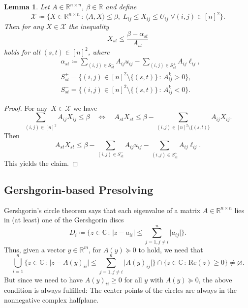 \documentclass[10pt, a4paper]{article}
\renewcommand{\Re}{\text{Re}}
\newcommand{\suchthat}{\,:\,}
\newcommand{\abs}[1]{\lvert{#1}\rvert}
\newcommand{\define}{\coloneqq}
\newcommand{\skal}[2]{\langle{#1},{#2}\rangle}
\newcommand{\R}{\mathds{R}}
\newcommand{\C}{\mathds{C}}
\newtheorem{lemma}[theorem]{Lemma}
\begin{document}
\begin{lemma}
  Let $A \in \R^{n \times n}$, $\beta \in \R$ and define
  \[
    \mathcal{X} \define \{ X \in \R^{n\times n} \suchthat \skal{A}{X} \leq
    \beta,\; L_{ij} \leq X_{ij} \leq U_{ij}\; \forall (i,j) \in [n]^2\}.
  \]
  Then for any $X \in \mathcal{X}$ the inequality
  \[
    X_{st} \leq \frac{\beta - \alpha_{st}}{A_{st}}
  \]
  holds for all $(s,t) \in [n]^2$, where
  \begin{align*}
    & \alpha_{st} \define \sum_{(i,j) \in S^-_{st}} A_{ij} u_{ij} - \sum_{(i,j) \in S^+_{st}} A_{ij} \ell_{ij},\\
    & S^+_{st} = \{(i,j) \in [n]^2 \setminus \{(s,t)\} \suchthat A^k_{ij} > 0\},\\
    & S^-_{st} = \{(i,j) \in [n]^2 \setminus \{(s,t)\} \suchthat A^k_{ij} < 0\}.
  \end{align*}
\end{lemma}

\begin{proof}
  For any~$X \in \mathcal{X}$ we have
  \[
    \sum_{(i,j) \in [n]^2} A_{ij} X_{ij} \leq \beta
    \quad\Leftrightarrow\quad A_{st} X_{st} \leq \beta - \sum_{(i,j) \in [n]^2
      \setminus \{(s,t)\}} A_{ij} X_{ij}.
  \]
  Then
  \[
    A_{st} X_{st} \leq \beta - \sum_{(i,j) \in S^-_{st}} A_{ij} u_{ij} - \sum_{(i,j) \in S^+_{st}} A_{ij} \ell_{ij}.
  \]
  This yields the claim.
\end{proof}


\subsection{Gershgorin-based Presolving}

Gershgorin's circle theorem says that each eigenvalue of a matrix
$A \in \R^{n \times n}$ lies in (at least) one of the Gershgorin discs
\[
  D_i \define \Big\{z \in \C \suchthat \abs{z - a_{ii}} \leq \sum_{j=1, j \neq
    i}^n \abs{a_{ij}} \Big\}.
\]
Thus, given a vector $y \in \R^m$, for $A(y) \succeq 0$ to hold, we need
that
\[
  \bigcup_{i=1}^n \bigg\{z \in \C \suchthat \abs{z - A(y)_{ii}} \leq \sum_{j=1, j \neq
    i}^n \abs{A(y)_{ij}}\bigg\} \cap \{z \in \C \suchthat \Re(z) \geq 0\}
  \neq \varnothing.
\]
But since we need to have $A(y)_{ii} \geq 0$ for all $y$ with
$A(y) \succeq 0$, the above condition is always fulfilled: The center
points of the circles are always in the nonnegative complex halfplane.
\end{document}
